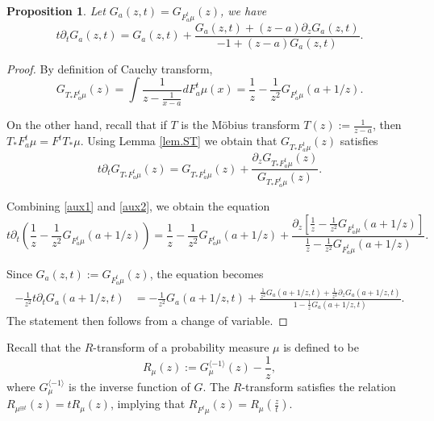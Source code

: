 \documentclass[reqno,11pt]{amsart}
\newtheorem{proposition}[theorem]{Proposition}
\theoremstyle{remark}
\newcommand{\freepower}[1]{F^{#1}}
\newcommand{\pfreepower}[2]{F_{#1}^{#2}}
\begin{document}
\begin{proposition}
\label{prop:pde.cauchy}
    Let $ G_a(z,t)= G_{ \pfreepower{a}{t}\mu }(z) $, we have $$ t\partial_t G_a(z,t)
    = G_a(z,t)+\frac{ G_a(z,t)+(z-a) \partial_z G_a(z,t) }{-1+(z-a)G_a(z,t)}. $$
\end{proposition}
\begin{proof}
By definition of Cauchy transform,
\begin{equation}
\label{aux1}
 G_{T_* \pfreepower{a}{t}\mu}(z) = \int \frac{1}{z-\frac{1}{x-a}} d\pfreepower{a}{t}\mu(x) = \frac{1}{z}-\frac{1}{z^2}G_{\pfreepower{a}{t}\mu}( a+1/z ).
 \end{equation}

On the other hand, recall that if $T$ is the Möbius transform $T(z):=\frac{1}{z-a}$, then $ T_* \pfreepower{a}{t}\mu = F^t T_*\mu $. Using Lemma \ref{lem.ST} we obtain that $G_{T_* \pfreepower{a}{t}\mu}(z)$ satisfies 
\begin{equation}
\label{aux2}
t\partial_tG_{T_* \pfreepower{a}{t}\mu}(z) = G_{T_* \pfreepower{a}{t}\mu}(z)+ \frac{\partial_z G_{T_* \pfreepower{a}{t}\mu}(z)}{G_{T_* \pfreepower{a}{t}\mu}(z)} .
\end{equation}

Combining \eqref{aux1}  and \eqref{aux2}, we obtain the equation
$$ t\partial_t\left( \frac{1}{z}-\frac{1}{z^2}G_{\pfreepower{a}{t}\mu}( a+1/z ) \right) = \frac{1}{z}-\frac{1}{z^2}G_{\pfreepower{a}{t}\mu}( a+1/z ) + \frac{ \partial_z\left[\frac{1}{z}-\frac{1}{z^2}G_{\pfreepower{a}{t}\mu}( a+1/z )\right] }{\frac{1}{z}-\frac{1}{z^2}G_{\pfreepower{a}{t}\mu}( a+1/z )}.$$

Since $G_a(z,t):= G_{\pfreepower{a}{t}\mu}(z)$, the equation becomes
\begin{align*}
    -\frac{1}{z^2}t\partial_t G_a(a+1/z,t) 
    &= -\frac{1}{z^2}G_a(a+1/z,t)+\frac{ \frac{1}{z^2}G_a(a+1/z,t)+\frac{1}{z^3}\partial_zG_a(a+1/z,t) }{1-\frac{1}{z}G_a(a+1/z,t) }.
\end{align*}
The statement then follows from a change of variable.
\end{proof}

Recall that the $R$-transform of a probability measure $\mu$ is defined to be
$$ R_\mu(z) :=G_\mu^{\langle -1\rangle}(z)-\frac{1}{z}, $$
where $ G_\mu^{\langle -1\rangle} $ is the inverse function of $G$. The $R$-transform satisfies the relation $ R_{\mu^{\boxplus t}}(z) = t R_{\mu}(z)  $, implying that $ R_{\freepower{t}\mu}(z) = R_\mu(\tfrac{z}{t}) $.
\end{document}
